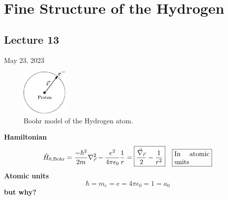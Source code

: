 \documentclass[12pt,fancychapters]{report}
\numberwithin{equation}{section}
\begin{document}
\chapter{Fine Structure of the Hydrogen}
\section{Lecture 13}
May 23, 2023\\
\begin{figure}
  \begin{center}
\includegraphics[width=0.2\textwidth]{../Figures/FSTR.pdf}
\caption{Boohr model of the Hydrogen atom.}
  \end{center}
\end{figure}
\textbf{Hamiltonian}
\[
  \hat{H}_{0,\text{Bohr}} = \frac{-\hbar^2}{2m}\nabla^2_{\vec{r}}
  - \frac{e^2}{4\pi\epsilon_0}\frac{1}{r}=
  \boxed{\frac{\vec{\nabla}_{\vec{r}}}{2} - \frac{1}{r^2}}\quad
  \fbox{%
  \parbox{.15\textwidth}{%
  In atomic units}%
} 
\]
\textbf{Atomic units}
\[
  \hbar = m_e = e = 4\pi \epsilon_0 = 1 = a_0
\]
\textbf{but why?}
\end{document}
